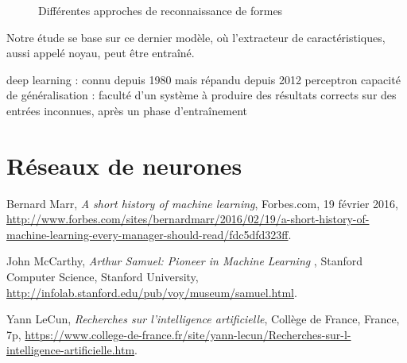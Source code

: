 \documentclass[a4paper,10pt]{report}
\begin{document}
\begin{figure}[!h]
    \centering
    \makebox[\textwidth]{}
    \caption{Différentes approches de reconnaissance de formes}
    \label{fig:c1p1s2}
\end{figure}

Notre étude se base sur ce dernier modèle, où l'extracteur de caractéristiques, aussi appelé noyau, peut être entraîné.

deep learning : connu depuis 1980 mais répandu depuis 2012
perceptron
capacité de généralisation : faculté d'un système à produire des résultats corrects sur des entrées inconnues, après un phase d'entraînement

\section{Réseaux de neurones}

\begin{thebibliography}{9}
  Bernard Marr,
  \emph{A short history of machine learning},
  Forbes.com, 19 février 2016,
  \hyperref[Bib_Marr]{http://www.forbes.com/sites/bernardmarr/2016/02/19/a-short-history-of-machine-learning-every-manager-should-read/fdc5dfd323ff}.
  
  John McCarthy,
  \emph{Arthur Samuel: Pioneer in Machine Learning },
  Stanford Computer Science, Stanford University,
  \hyperref[Bib_McCar]{http://infolab.stanford.edu/pub/voy/museum/samuel.html}.
  

  Yann LeCun,
  \emph{Recherches sur l'intelligence artificielle},
  Collège de France, France,
  7p,
  \hyperref[Bib_LeCun]{https://www.college-de-france.fr/site/yann-lecun/Recherches-sur-l-intelligence-artificielle.htm}.

\end{thebibliography}
\end{document}
